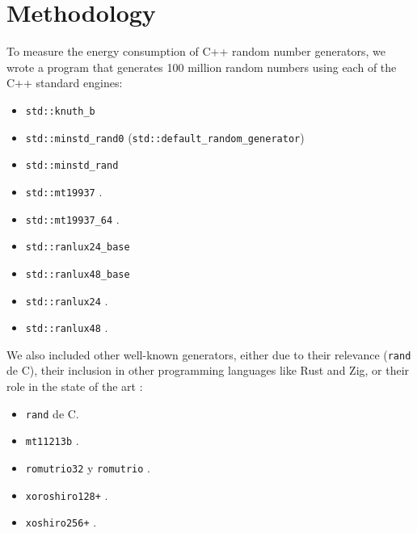 \documentclass[sigconf]{acmart}
\begin{document}
\section{Methodology}
\label{sec:methodology}

To measure the energy consumption of C++ random number generators, we wrote a program that generates 100 million random numbers using each of the C++ standard engines:
\begin{itemize}
    \item \texttt{std::knuth\_b}
    \item \texttt{std::minstd\_rand0} (\texttt{std::default\_random\_generator})
    \item \texttt{std::minstd\_rand}
    \item \texttt{std::mt19937} \cite{mersennetwister}.
    \item \texttt{std::mt19937\_64} \cite{mersennetwister}.
    \item \texttt{std::ranlux24\_base}
    \item \texttt{std::ranlux48\_base}
    \item \texttt{std::ranlux24} \cite{JAMES1994111}.
    \item \texttt{std::ranlux48} \cite{JAMES1994111}.
\end{itemize}

We also included other well-known generators, either due to their relevance (\texttt{rand} de C), their inclusion in other programming languages like Rust and Zig, or their role in the state of the art :

\begin{itemize}
    \item \texttt{rand} de C.
    \item \texttt{mt11213b} \cite{mersennetwister}.
    \item \texttt{romutrio32} y \texttt{romutrio} \cite{overton2020romufastnonlinearpseudorandom}.
    \item \texttt{xoroshiro128+} \cite{blackman2021scrambled}.
    \item \texttt{xoshiro256+} \cite{blackman2021scrambled}.
\end{itemize}
\end{document}
